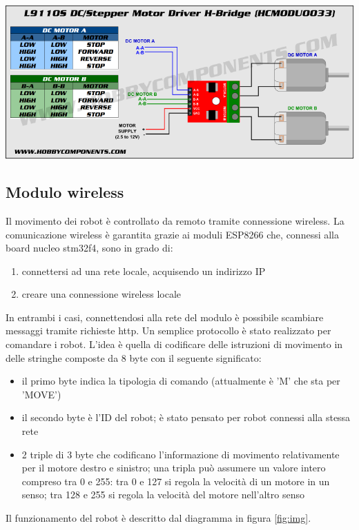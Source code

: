 \documentclass [11pt ,a4paper ,twoside ]{article}
\begin{document}
\begin{center}
\includegraphics[keepaspectratio, width=400pt]{Images/motor_driver_diagram.png}
\end{center}

\subsection{Modulo wireless}
Il movimento dei robot \`e controllato da remoto tramite connessione wireless. La comunicazione wireless \`e garantita grazie ai moduli ESP8266 che, connessi alla board nucleo stm32f4, sono in grado di:
\begin{enumerate}
	\item connettersi ad una rete locale, acquisendo un indirizzo IP
	\item creare una connessione wireless locale
\end{enumerate}
In entrambi i casi, connettendosi alla rete del modulo \`e possibile scambiare messaggi tramite richieste http. Un semplice protocollo \`e stato realizzato per comandare i robot. L'idea \`e quella di codificare delle istruzioni di movimento in delle stringhe composte da 8 byte con il seguente significato:
\begin{itemize}
	\item il primo byte indica la tipologia di comando (attualmente \`e 'M' che sta per 'MOVE')
	\item il secondo byte \`e l'ID del robot; \`e stato pensato per robot connessi alla stessa rete
	\item 2 triple di 3 byte che codificano l'informazione di movimento relativamente per il motore destro e sinistro; una tripla pu\`o assumere un valore intero compreso tra 0 e 255: tra 0 e 127 si regola la velocit\`a di un motore in un senso; tra 128 e 255 si regola la velocit\`a del motore nell'altro senso
\end{itemize}
Il funzionamento del robot \`e descritto dal diagramma in figura \ref{fig:img}.
\end{document}
